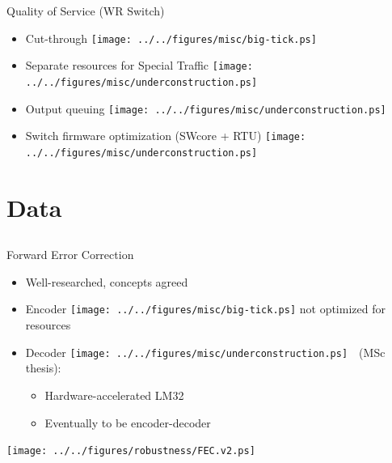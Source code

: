 \documentclass[compress,red]{beamer}
\begin{document}
\begin{frame}{Quality of Service (WR Switch)}

  \begin{itemize}
    \item Cut-through \texttt{[image: ../../figures/misc/big-tick.ps]}
    \item Separate resources for Special Traffic \texttt{[image: ../../figures/misc/underconstruction.ps]}
    \item Output queuing \texttt{[image: ../../figures/misc/underconstruction.ps]}
    \item Switch firmware optimization (SWcore + RTU) \texttt{[image: ../../figures/misc/underconstruction.ps]}
  \end{itemize}

\end{frame}

\section{Data}
\subsection{}
\begin{frame}{Forward Error Correction}

  \begin{itemize}
    \item Well-researched, concepts agreed
    \item Encoder \texttt{[image: ../../figures/misc/big-tick.ps]}  not optimized for resources
    \item Decoder \texttt{[image: ../../figures/misc/underconstruction.ps]}~~(MSc thesis):
    \begin{itemize}
      \item Hardware-accelerated LM32
      \item Eventually to be encoder-decoder
    \end{itemize}

  \end{itemize}

      \begin{center}
	\texttt{[image: ../../figures/robustness/FEC.v2.ps]}
      \end{center}  

\end{frame}
\end{document}
